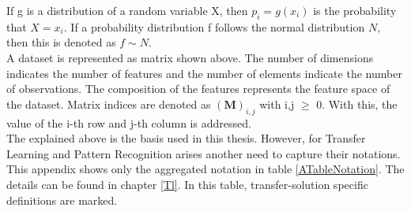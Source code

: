 If g is a distribution of a random variable X, then $p_i=g(x_i)$ is the probability that $X=x_i$.
If a probability distribution f follows the normal distribution $N$, then this is denoted as $f\sim N$.\\
A dataset is represented as matrix shown above.
The number of dimensions indicates the number of features and the number of elements indicate the number of observations.
The composition of the features represents the feature space of the dataset.
Matrix indices are denoted as $(\mathbf{M})_{i,j}$ with i,j $\ge$ 0.
With this, the value of the i-th row and j-th column is addressed.\\
The explained above is the basis used in this thesis. 
However, for Transfer Learning and Pattern Recognition arises another need to capture their notations.
This appendix shows only the aggregated notation in table \ref{ATableNotation}.
The details can be found in chapter \ref{Tl}.
In this table, transfer-solution specific definitions are marked.
